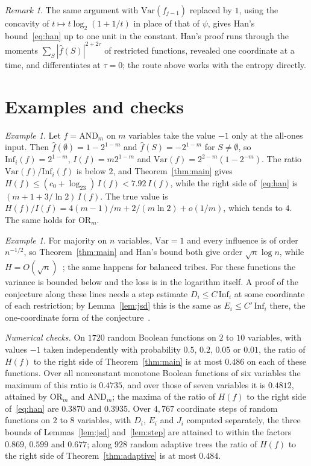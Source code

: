 \documentclass[11pt]{amsart}
\theoremstyle{remark}
\newtheorem{remark}[theorem]{Remark}
\newtheorem{example}[theorem]{Example}
\newcommand{\Inf}{\mathrm{Inf}}
\newcommand{\Var}{\mathrm{Var}}
\begin{document}
\begin{remark}
The same argument with $\Var(f_{j-1})$ replaced by $1$, using the concavity of $t\mapsto t\log_2(1+1/t)$ in place of
that of $\psi$, gives Han's bound~\eqref{eq:han} up to one unit in the constant. Han's proof runs through the moments
$\sum_S|\hat f(S)|^{2+2\tau}$ of restricted functions, revealed one coordinate at a time, and differentiates at
$\tau=0$; the route above works with the entropy directly.
\end{remark}

\section{Examples and checks}\label{sec:ex}

\begin{example}\label{ex:and}
Let $f=\mathrm{AND}_m$ on $m$ variables take the value $-1$ only at the all-ones input. Then $\hat f(\emptyset)=1-2^{1-m}$ and
$\hat f(S)=-2^{1-m}$ for $S\ne\emptyset$, so $\Inf_i(f)=2^{1-m}$, $I(f)=m2^{1-m}$ and
$\Var(f)=2^{2-m}(1-2^{-m})$. The ratio $\Var(f)/\Inf_i(f)$ is below $2$, and Theorem~\ref{thm:main} gives
$H(f)\le(c_0+\log_23)\,I(f)<7.92\,I(f)$, while the right side of~\eqref{eq:han} is $(m+1+3/\ln2)\,I(f)$. The true value is
$H(f)/I(f)=4(m-1)/m+2/(m\ln2)+o(1/m)$, which tends to $4$. The same holds for $\mathrm{OR}_m$.
\end{example}

\begin{example}
For majority on $n$ variables, $\Var=1$ and every influence is of order $n^{-1/2}$, so Theorem~\ref{thm:main} and
Han's bound both give order $\sqrt n\log n$, while $H=O(\sqrt n)$~\cite{OWZ11}; the same happens for balanced tribes.
For these functions the variance is bounded below and the loss is in the logarithm itself. A proof of the conjecture
along these lines needs a step estimate $D_i\le C\,\Inf_i$ at some coordinate of each restriction; by
Lemma~\ref{lem:jsd} this is the same as $E_i\le C'\,\Inf_i$ there, the one-coordinate form of the
conjecture~\cite{GMP,Shm1}.
\end{example}

\textit{Numerical checks.} On $1720$ random Boolean functions on $2$ to $10$ variables, with values $-1$ taken
independently with probability $0.5$, $0.2$, $0.05$ or $0.01$, the ratio of $H(f)$ to the right side of
Theorem~\ref{thm:main} is at most $0.486$ on each of these functions. Over all nonconstant monotone Boolean functions of six variables the maximum of this ratio
is $0.4735$, and over those of seven variables it is $0.4812$, attained by $\mathrm{OR}_m$ and $\mathrm{AND}_m$; the
maxima of the ratio of $H(f)$ to the right side of~\eqref{eq:han} are $0.3870$ and $0.3935$. Over $4{,}767$ coordinate steps of random functions on $2$ to $8$
variables, with $D_i$, $E_i$ and $J_i$ computed separately, the three bounds of Lemmas~\ref{lem:jsd} and~\ref{lem:step} are attained to within the factors $0.869$, $0.599$
and $0.677$; along $928$ random adaptive trees the ratio of $H(f)$ to the right side of Theorem~\ref{thm:adaptive} is
at most $0.484$.
\end{document}
